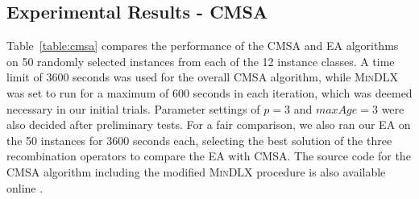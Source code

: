 \documentclass{IEEEtran}
\begin{document}
\subsection{Experimental Results - CMSA}
\label{sub:expcmsa}
Table~\ref{table:cmsa} compares the performance of the CMSA and EA algorithms on 50 randomly selected instances from each of the 12 instance classes. A time limit of 3600 seconds was used for the overall CMSA algorithm, while \textsc{MinDLX} was set to run for a maximum of 600 seconds in each iteration, which was deemed necessary in our initial trials. Parameter settings of $p = 3$ and $maxAge = 3$ were also decided after preliminary tests. For a fair comparison, we also ran our EA on the 50 instances for 3600 seconds each, selecting the best solution of the three recombination operators to compare the EA with CMSA. The source code for the CMSA algorithm including the modified \textsc{MinDLX} procedure is also available online \cite{hawa2019cmsa}.
\end{document}
